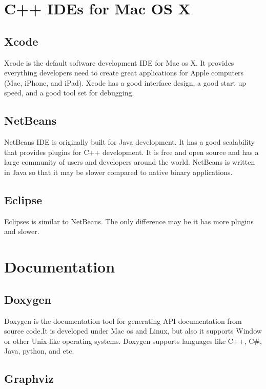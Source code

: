 \hypertarget{_development_tools_DevelopmentToolsCppIDEsforMacOSX}{}\section{C++ I\+D\+Es for Mac O\+S X}\label{_development_tools_DevelopmentToolsCppIDEsforMacOSX}
\hypertarget{_development_tools_DevelopmentToolsCppIDEsforMacOSXXcode}{}\subsection{Xcode}\label{_development_tools_DevelopmentToolsCppIDEsforMacOSXXcode}
Xcode is the default software development I\+D\+E for Mac os X. It provides everything developers need to create great applications for Apple computers (Mac, i\+Phone, and i\+Pad). Xcode has a good interface design, a good start up speed, and a good tool set for debugging. \hypertarget{_development_tools_DevelopmentToolsCppIDEsforMacOSXNetBeans}{}\subsection{Net\+Beans}\label{_development_tools_DevelopmentToolsCppIDEsforMacOSXNetBeans}
Net\+Beans I\+D\+E is originally built for Java development. It has a good scalability that provides plugins for C++ development. It is free and open source and has a large community of users and developers around the world. Net\+Beans is written in Java so that it may be slower compared to native binary applications. \hypertarget{_development_tools_DevelopmentToolsCppIDEsforMacOSXEclipse}{}\subsection{Eclipse}\label{_development_tools_DevelopmentToolsCppIDEsforMacOSXEclipse}
Eclipses is similar to Net\+Beans. The only difference may be it has more plugins and slower.\hypertarget{_development_tools_DevelopmentToolsDocumentation}{}\section{Documentation}\label{_development_tools_DevelopmentToolsDocumentation}
\hypertarget{_development_tools_DevelopmentToolsDocumentationDoxygen}{}\subsection{Doxygen}\label{_development_tools_DevelopmentToolsDocumentationDoxygen}
Doxygen is the documentation tool for generating A\+P\+I documentation from source code.\+It is developed under Mac os and Linux, but also it supports Window or other Unix-\/like operating systems. Doxygen supports languages like C++, C\#, Java, python, and etc. \hypertarget{_development_tools_DevelopmentToolsDocumentationGraphviz}{}\subsection{Graphviz}\label{_development_tools_DevelopmentToolsDocumentationGraphviz}
